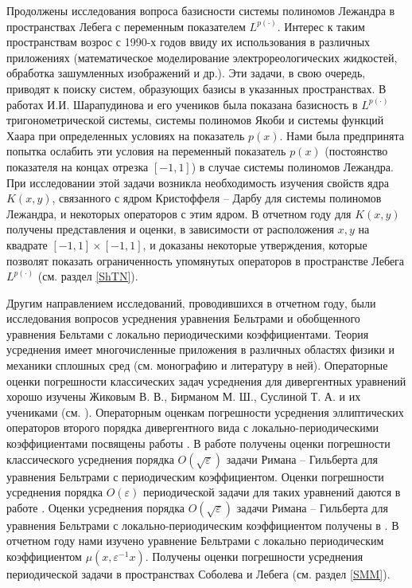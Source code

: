 Продолжены исследования вопроса базисности системы полиномов Лежандра в пространствах Лебега с переменным показателем $L^{p(\cdot)}$. Интерес к таким пространствам возрос с 1990-х годов ввиду их использования в различных приложениях (математическое моделирование электрореологических жидкостей, обработка зашумленных изображений и др.). Эти задачи, в свою очередь, приводят к поиску систем, образующих базисы в указанных пространствах. В работах И.И. Шарапудинова и его учеников \cite{tad-SHII-Haar, tad-SHII-AnalisysMath, tad-SHII-Leg, tad-MMG-Haar, tad-SHII-Jacob, tad-SHII-Ult, tad-RAM-Jacob} была показана базисность в $L^{p(\cdot)}$  тригонометрической системы, системы полиномов Якоби и системы функций Хаара при определенных условиях на показатель $p(x)$.
Нами была предпринята попытка ослабить эти условия на переменный показатель $p(x)$ (постоянство показателя на концах отрезка $[-1,1]$) в случае системы полиномов Лежандра. При исследовании этой задачи возникла необходимость изучения свойств ядра $K(x,y)$, связанного с ядром Кристоффеля -- Дарбу для системы полиномов Лежандра, и некоторых операторов с этим ядром. В отчетном году для $K(x,y)$ получены представления и оценки, в зависимости от расположения $x,y$ на квадрате $[-1,1]\times[-1,1]$, и доказаны некоторые утверждения, которые позволят показать ограниченность упомянутых операторов в пространстве Лебега $L^{p(\cdot)}$ (см. раздел \ref{ShTN}).

Другим направлением исследований, проводившихся в отчетном году, были исследования вопросов усреднения уравнения Бельтрами и обобщенного уравнения Бельтами с локально периодическими коэффициентами. Теория усреднения имеет многочисленные приложения в различных областях физики и механики сплошных сред (см. монографию \cite{smm-1} и литературу в  ней). Операторные оценки погрешности классических задач усреднения для дивергентных уравнений хорошо изучены Жиковым В. В., Бирманом   М. Ш., Суслиной  Т. А. и их учениками (см. \cite{smm-2, smm-3}).
Операторным оценкам погрешности усреднения  эллиптических операторов второго порядка дивергентного вида  с локально-периодическими коэффициентами посвящены работы \cite{smm-4, smm-5, smm-6, smm-7}.
В работе \cite{smm-8} получены оценки погрешности классического усреднения порядка  $O(\sqrt\varepsilon)$ задачи Римана -- Гильберта  для уравнения Бельтрами с периодическим коэффициентом. Оценки погрешности усреднения порядка $O(\varepsilon)$ периодической задачи для таких уравнений даются в работе \cite{smm-9}.  Оценки усреднения  порядка $O(\sqrt\varepsilon)$  задачи Римана -- Гильберта для уравнения Бельтрами с локально-периодическим коэффициентом получены  в \cite{smm-10}. В отчетном году нами изучено уравнение Бельтрами с локально периодическим коэффициентом $\mu(x,\varepsilon^{-1} x)$. Получены оценки
погрешности усреднения периодической задачи в пространствах Соболева и Лебега (см. раздел \ref{SMM}).


